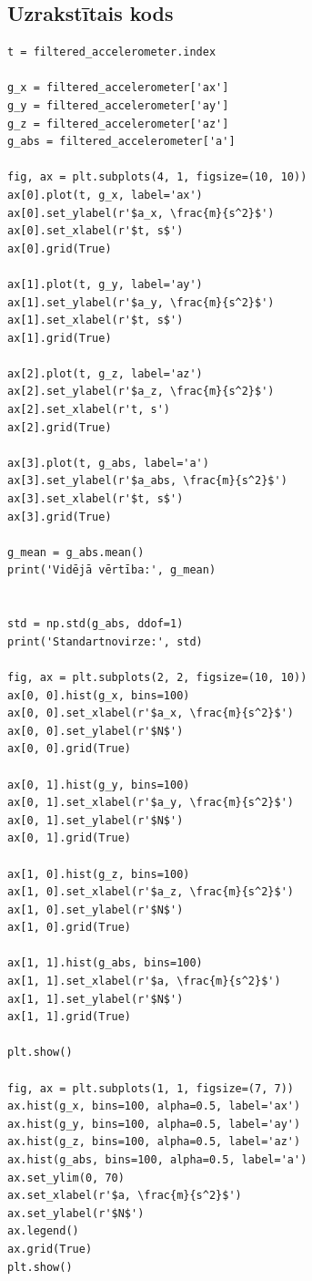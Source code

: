 \documentclass[12pt]{article}
\begin{document}
\subsection*{Uzrakstītais kods}
\begin{center}
    \begin{verbatim}
t = filtered_accelerometer.index
        
g_x = filtered_accelerometer['ax']
g_y = filtered_accelerometer['ay']
g_z = filtered_accelerometer['az']
g_abs = filtered_accelerometer['a']
        
fig, ax = plt.subplots(4, 1, figsize=(10, 10))
ax[0].plot(t, g_x, label='ax')
ax[0].set_ylabel(r'$a_x, \frac{m}{s^2}$')
ax[0].set_xlabel(r'$t, s$')
ax[0].grid(True)
        
ax[1].plot(t, g_y, label='ay')
ax[1].set_ylabel(r'$a_y, \frac{m}{s^2}$')
ax[1].set_xlabel(r'$t, s$')
ax[1].grid(True)
        
ax[2].plot(t, g_z, label='az')
ax[2].set_ylabel(r'$a_z, \frac{m}{s^2}$')
ax[2].set_xlabel(r't, s')
ax[2].grid(True)
        
ax[3].plot(t, g_abs, label='a')
ax[3].set_ylabel(r'$a_abs, \frac{m}{s^2}$')
ax[3].set_xlabel(r'$t, s$')
ax[3].grid(True)
        
g_mean = g_abs.mean()
print('Vidējā vērtība:', g_mean)
        
        
std = np.std(g_abs, ddof=1)
print('Standartnovirze:', std)
        
fig, ax = plt.subplots(2, 2, figsize=(10, 10))
ax[0, 0].hist(g_x, bins=100)
ax[0, 0].set_xlabel(r'$a_x, \frac{m}{s^2}$')
ax[0, 0].set_ylabel(r'$N$')
ax[0, 0].grid(True)
        
ax[0, 1].hist(g_y, bins=100)
ax[0, 1].set_xlabel(r'$a_y, \frac{m}{s^2}$')
ax[0, 1].set_ylabel(r'$N$')
ax[0, 1].grid(True)
        
ax[1, 0].hist(g_z, bins=100)
ax[1, 0].set_xlabel(r'$a_z, \frac{m}{s^2}$')
ax[1, 0].set_ylabel(r'$N$')
ax[1, 0].grid(True)
        
ax[1, 1].hist(g_abs, bins=100)
ax[1, 1].set_xlabel(r'$a, \frac{m}{s^2}$')
ax[1, 1].set_ylabel(r'$N$')
ax[1, 1].grid(True)
        
plt.show()

fig, ax = plt.subplots(1, 1, figsize=(7, 7))
ax.hist(g_x, bins=100, alpha=0.5, label='ax')
ax.hist(g_y, bins=100, alpha=0.5, label='ay')
ax.hist(g_z, bins=100, alpha=0.5, label='az')
ax.hist(g_abs, bins=100, alpha=0.5, label='a')
ax.set_ylim(0, 70)
ax.set_xlabel(r'$a, \frac{m}{s^2}$')
ax.set_ylabel(r'$N$')
ax.legend()
ax.grid(True)
plt.show()
    \end{verbatim}
\end{center}
\end{document}
